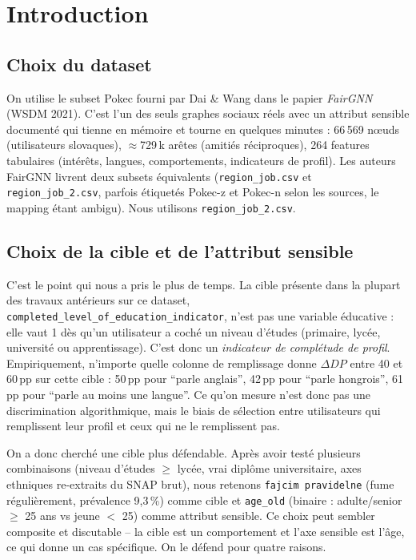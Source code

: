 \documentclass[10pt,a4paper,twocolumn]{article}
\begin{document}
\section{Introduction}

\subsection{Choix du dataset}

On utilise le subset Pokec fourni par Dai \& Wang dans le papier \emph{FairGNN} (WSDM 2021). C'est l'un des seuls graphes sociaux réels avec un attribut sensible documenté qui tienne en mémoire et tourne en quelques minutes : 66\,569 nœuds (utilisateurs slovaques), $\approx$729\,k arêtes (amitiés réciproques), 264 features tabulaires (intérêts, langues, comportements, indicateurs de profil). Les auteurs FairGNN livrent deux subsets équivalents (\texttt{region\_job.csv} et \texttt{region\_job\_2.csv}, parfois étiquetés Pokec-z et Pokec-n selon les sources, le mapping étant ambigu). Nous utilisons \texttt{region\_job\_2.csv}.

\subsection{Choix de la cible et de l'attribut sensible}

C'est le point qui nous a pris le plus de temps. La cible présente dans la plupart des travaux antérieurs sur ce dataset, \texttt{completed\_level\_of\_education\_indicator}, n'est pas une variable éducative : elle vaut 1 dès qu'un utilisateur a coché un niveau d'études (primaire, lycée, université ou apprentissage). C'est donc un \emph{indicateur de complétude de profil}. Empiriquement, n'importe quelle colonne de remplissage donne $\Delta DP$ entre 40 et 60\,pp sur cette cible : 50\,pp pour ``parle anglais'', 42\,pp pour ``parle hongrois'', 61\,pp pour ``parle au moins une langue''. Ce qu'on mesure n'est donc pas une discrimination algorithmique, mais le biais de sélection entre utilisateurs qui remplissent leur profil et ceux qui ne le remplissent pas.

\vspace*{0.15cm}
On a donc cherché une cible plus défendable. Après avoir testé plusieurs combinaisons (niveau d'études $\geq$ lycée, vrai diplôme universitaire, axes ethniques re-extraits du SNAP brut), nous retenons \texttt{fajcim pravidelne} (fume régulièrement, prévalence 9{,}3\,\%) comme cible et \texttt{age\_old} (binaire : adulte/senior $\geq$ 25 ans vs jeune $<$ 25) comme attribut sensible. Ce choix peut sembler composite et discutable -- la cible est un comportement et l'axe sensible est l'âge, ce qui donne un cas spécifique. On le défend pour quatre raisons.
\end{document}

